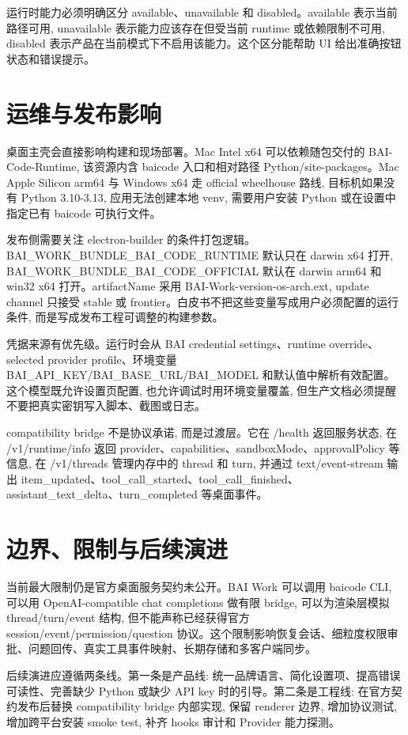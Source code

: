 运行时能力必须明确区分 available、unavailable 和 disabled。available 表示当前路径可用, unavailable 表示能力应该存在但受当前 runtime 或依赖限制不可用, disabled 表示产品在当前模式下不启用该能力。这个区分能帮助 UI 给出准确按钮状态和错误提示。

\section{运维与发布影响}
桌面主壳会直接影响构建和现场部署。Mac Intel x64 可以依赖随包交付的 BAI-Code-Runtime, 该资源内含 baicode 入口和相对路径 Python/site-packages。Mac Apple Silicon arm64 与 Windows x64 走 official wheelhouse 路线, 目标机如果没有 Python 3.10-3.13, 应用无法创建本地 venv, 需要用户安装 Python 或在设置中指定已有 baicode 可执行文件。

发布侧需要关注 electron-builder 的条件打包逻辑。BAI\_WORK\_BUNDLE\_BAI\_CODE\_RUNTIME 默认只在 darwin x64 打开, BAI\_WORK\_BUNDLE\_BAI\_CODE\_OFFICIAL 默认在 darwin arm64 和 win32 x64 打开。artifactName 采用 BAI-Work-{version}-{os}-{arch}.{ext}, update channel 只接受 stable 或 frontier。白皮书不把这些变量写成用户必须配置的运行条件, 而是写成发布工程可调整的构建参数。

凭据来源有优先级。运行时会从 BAI credential settings、runtime override、selected provider profile、环境变量 BAI\_API\_KEY/BAI\_BASE\_URL/BAI\_MODEL 和默认值中解析有效配置。这个模型既允许设置页配置, 也允许调试时用环境变量覆盖, 但生产文档必须提醒不要把真实密钥写入脚本、截图或日志。

compatibility bridge 不是协议承诺, 而是过渡层。它在 /health 返回服务状态, 在 /v1/runtime/info 返回 provider、capabilities、sandboxMode、approvalPolicy 等信息, 在 /v1/threads 管理内存中的 thread 和 turn, 并通过 text/event-stream 输出 item\_updated、tool\_call\_started、tool\_call\_finished、assistant\_text\_delta、turn\_completed 等桌面事件。

\section{边界、限制与后续演进}
当前最大限制仍是官方桌面服务契约未公开。BAI Work 可以调用 baicode CLI, 可以用 OpenAI-compatible chat completions 做有限 bridge, 可以为渲染层模拟 thread/turn/event 结构, 但不能声称已经获得官方 session/event/permission/question 协议。这个限制影响恢复会话、细粒度权限审批、问题回传、真实工具事件映射、长期存储和多客户端同步。

后续演进应遵循两条线。第一条是产品线: 统一品牌语言、简化设置项、提高错误可读性、完善缺少 Python 或缺少 API key 时的引导。第二条是工程线: 在官方契约发布后替换 compatibility bridge 内部实现, 保留 renderer 边界, 增加协议测试, 增加跨平台安装 smoke test, 补齐 hooks 审计和 Provider 能力探测。

